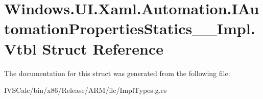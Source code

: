 \hypertarget{struct_windows_1_1_u_i_1_1_xaml_1_1_automation_1_1_i_automation_properties_statics_____impl_1_1_vtbl}{}\section{Windows.\+U\+I.\+Xaml.\+Automation.\+I\+Automation\+Properties\+Statics\+\_\+\+\_\+\+Impl.\+Vtbl Struct Reference}
\label{struct_windows_1_1_u_i_1_1_xaml_1_1_automation_1_1_i_automation_properties_statics_____impl_1_1_vtbl}


The documentation for this struct was generated from the following file\+:\begin{DoxyCompactItemize}
\item 
I\+V\+S\+Calc/bin/x86/\+Release/\+A\+R\+M/ilc/Impl\+Types.\+g.\+cs\end{DoxyCompactItemize}
